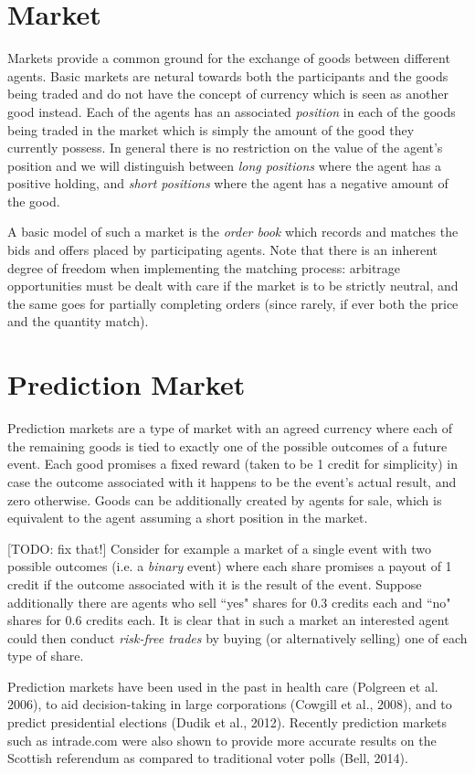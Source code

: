 \documentclass[bsc,frontabs,twoside,singlespacing,parskip,deptreport]{infthesis}     %
\begin{document}
\section{Market}
	Markets provide a common ground for the exchange of goods between different agents. Basic markets are netural towards both the participants and the goods being traded and do not have the concept of currency which is seen as another good instead. Each of the agents has an associated {\em position} in each of the goods being traded in the market which is simply the amount of the good they currently possess. In general there is no restriction on the value of the agent's position and we will distinguish between {\em long positions} where the agent has a positive holding, and {\em short positions} where the agent has a negative amount of the good. 

	A basic model of such a market is the {\em order book} which records and matches the bids and offers placed by participating agents. Note that there is an inherent degree of freedom when implementing the matching process: arbitrage opportunities must be dealt with care if the market is to be strictly neutral, and the same goes for partially completing orders (since rarely, if ever both the price and the quantity match). 

\section{Prediction Market}
	Prediction markets are a type of market with an agreed currency where each of the remaining goods is tied to exactly one of the possible outcomes of a future event. Each good promises a fixed reward (taken to be 1 credit for simplicity) in case the outcome associated with it happens to be the event's actual result, and zero otherwise. Goods can be additionally created by agents for sale, which is equivalent to the agent assuming a short position in the market. 
	
	[TODO: fix that!]
	Consider for example a market of a single event with two possible outcomes (i.e. a {\em binary} event) where each share promises a payout of 1 credit if the outcome associated with it is the result of the event. Suppose additionally there are agents who sell ``yes" shares for 0.3 credits each and ``no" shares for 0.6 credits each. It is clear that in such a market an interested agent could then conduct {\em risk-free trades} by buying (or alternatively selling) one of each type of share. 

	Prediction markets have been used in the past in health care (Polgreen et al. 2006), to aid decision-taking in large corporations (Cowgill et al., 2008), and to predict presidential elections (Dudik et al., 2012). Recently prediction markets such as intrade.com were also shown to provide more accurate results on the Scottish referendum as compared to traditional voter polls (Bell, 2014).
\end{document}
